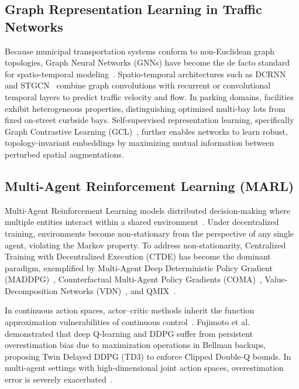 \documentclass[journal]{IEEEtran}
\begin{document}
\subsection{Graph Representation Learning in Traffic Networks}
Because municipal transportation systems conform to non-Euclidean graph topologies, Graph Neural Networks (GNNs) have become the de facto standard for spatio-temporal modeling~\cite{kipf2017semi,velickovic2018graph}. Spatio-temporal architectures such as DCRNN~\cite{li2018diffusion} and STGCN~\cite{yu2018spatio} combine graph convolutions with recurrent or convolutional temporal layers to predict traffic velocity and flow. In parking domains, facilities exhibit heterogeneous properties, distinguishing optimized multi-bay lots from fixed on-street curbside bays. Self-supervised representation learning, specifically Graph Contrastive Learning (GCL)~\cite{you2020graph,he2020momentum,chen2020simple}, further enables networks to learn robust, topology-invariant embeddings by maximizing mutual information between perturbed spatial augmentations.

\subsection{Multi-Agent Reinforcement Learning (MARL)}
Multi-Agent Reinforcement Learning models distributed decision-making where multiple entities interact within a shared environment~\cite{zhang2021multi,mnih2015human}. Under decentralized training, environments become non-stationary from the perspective of any single agent, violating the Markov property. To address non-stationarity, Centralized Training with Decentralized Execution (CTDE) has become the dominant paradigm, exemplified by Multi-Agent Deep Deterministic Policy Gradient (MADDPG)~\cite{lowe2017multi}, Counterfactual Multi-Agent Policy Gradients (COMA)~\cite{foerster2018counterfactual}, Value-Decomposition Networks (VDN)~\cite{sunehag2018value}, and QMIX~\cite{rashid2018qmix}. 

In continuous action spaces, actor--critic methods inherit the function approximation vulnerabilities of continuous control~\cite{lillicrap2016continuous}. Fujimoto et al.~\cite{fujimoto2018addressing} demonstrated that deep Q-learning and DDPG suffer from persistent overestimation bias due to maximization operations in Bellman backups, proposing Twin Delayed DDPG (TD3) to enforce Clipped Double-Q bounds. In multi-agent settings with high-dimensional joint action spaces, overestimation error is severely exacerbated~\cite{henderson2018deep,agarwal2021deep}.
\end{document}
